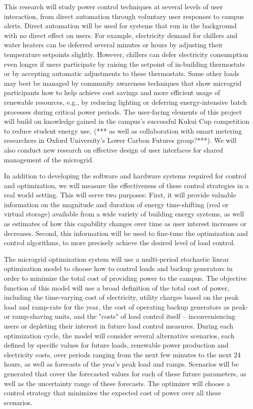 This research will study power control techniques at several levels of user 
interaction, from direct automation through voluntary user responses to campus 
alerts. Direct automation will be used for systems that run in 
the background with no direct effect on users. For example, electricity demand for 
chillers and water heaters can be deferred several minutes or hours 
by adjusting their temperature setpoints slightly. However, chillers can
defer electricity consumption even longer if users participate by raising
the setpoint of in-building thermostats or by accepting automatic adjustments 
to these thermostats. Some other loads may best be managed by community 
awareness techniques that show microgrid participants how to help achieve cost savings and more 
efficient usage of renewable resources, e.g., by reducing lighting or deferring
energy-intensive batch processes during critical power periods. 
The user-facing elements of this project will build on knowledge gained in the 
campus's successful Kukui Cup competition to reduce student energy use, 
(*** as well as collaboration with smart metering researchers in Oxford University's
Lower Carbon Futures group?***). We will 
also conduct new research on effective design of user interfaces for
shared management of the microgrid.

In addition to developing the software and hardware systems required 
for control and optimization, we will measure the effectiveness of these 
control strategies in a real world setting. This will serve two purposes: 
First, it will provide valuable
information on the magnitude and duration of energy time-shifting 
(real or virtual storage) available 
from a wide variety of building energy systems, as well as estimates of how
this capability changes over time as user interest increases or decreases. 
Second, this information will be used to fine-tune the
optimization and control algorithms, to more precisely achieve the desired
level of load control.

The microgrid optimization system will use a multi-period stochastic
linear optimization model to choose how to control loads and backup 
generators in order to minimize the total cost of providing power to the campus. 
The objective function of this model will use a broad definition
of the total cost of power, including the time-varying cost of electricity, 
utility charges based on the peak load and ramp-rate for the year,
the cost of operating backup generators as peak- or ramp-shaving units, 
and the "costs" of load control itself -- inconveniencing users or 
depleting their interest in future load control measures.
During each optimization cycle, the model will consider
several alternative scenarios, each defined by specific values for future
loads, renewable power production and electricity costs, over periods ranging from 
the next few minutes to the next 24 hours, as well as forecasts of the year's peak load 
and ramps. Scenarios will be generated that cover the forecasted values 
for each of these future parameters, as well as the uncertainty range of these
forecasts. The optimizer will choose a control strategy that minimizes
the expected cost of power over all these scenarios.

